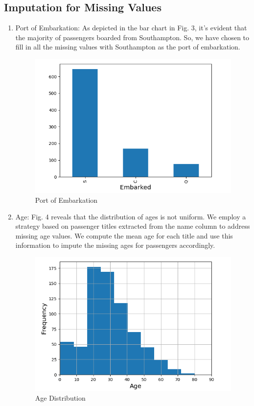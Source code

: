 \documentclass[conference]{IEEEtran}
\begin{document}
\subsection{Imputation for Missing Values}
\begin{enumerate}
    \item {Port of Embarkation:} As depicted in the bar chart in Fig. 3, it’s evident that the majority of passengers boarded from Southampton. So, we have chosen to fill in all the missing values with Southampton as the port of embarkation. 
    \begin{figure}[htbp]
    \centerline{\includegraphics[scale = 0.56]{port_histogram.png}}
    \caption{Port of Embarkation}
    \label{fig}
    \end{figure}
    \item {Age:} Fig. 4 reveals that the distribution of ages is not uniform. We employ a strategy based on passenger titles extracted from the name column to address missing age values. We compute the mean age for each title and use this information to impute the missing ages for passengers accordingly.
    \begin{figure}[htbp]
    \centerline{\includegraphics[scale = 0.56]{age_histogram.png}}
    \caption{Age Distribution}
    \label{fig}
    \end{figure}
\end{enumerate}
\end{document}
